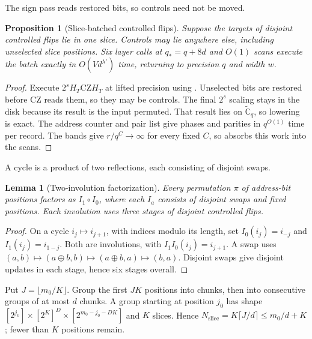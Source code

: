 \documentclass[11pt]{article}
\newtheorem{lemma}[theorem]{Lemma}
\newtheorem{proposition}[theorem]{Proposition}
\theoremstyle{definition}
\renewcommand{\label}[1]{}%
\newcommand{\Cg}{\widetilde{\mathbb{C}}}
\newcommand{\CZ}{\mathrm{CZ}}
\begin{document}
The sign pass reads restored bits, so controls need not be moved.

\begin{proposition}[Slice-batched controlled flips]\label{prop:slice-cnot}
Suppose the targets of disjoint controlled flips lie in one slice.
Controls may lie anywhere else, including unselected slice positions.
Six layer calls at $q_*=q+8d$ and $O(1)$ scans execute the batch exactly
in $O(Vd^{\lambda'})$ time, returning to precision $q$ and width $w$.
\end{proposition}
\begin{proof}
Execute $2^sH_T\CZ H_T$ at lifted precision using
.
Unselected bits are restored before $\CZ$ reads them, so they may be controls.
The final $2^s$ scaling stays in the disk because its result is the input permuted.
That result lies on $\Cg_q$, so lowering is exact.
The address counter and pair list give phases and parities in $q^{O(1)}$ time per record.
The bands give $r/q^C\to\infty$ for every fixed $C$, so  absorbs this work into the scans.
\end{proof}

A cycle is a product of two reflections, each consisting of disjoint swaps.

\begin{lemma}[Two-involution factorization]\label{lem:two-involutions}
Every permutation $\pi$ of address-bit positions factors as $I_1\circ I_0$,
where each $I_a$ consists of disjoint swaps and fixed positions.
Each involution uses three stages of disjoint controlled flips.
\end{lemma}
\begin{proof}
On a cycle $i_j\mapsto i_{j+1}$, with indices modulo its length, set
$I_0(i_j)=i_{-j}$ and $I_1(i_j)=i_{1-j}$.
Both are involutions, with $I_1I_0(i_j)=i_{j+1}$.
A swap uses
$(a,b)\mapsto(a\oplus b,b)\mapsto(a\oplus b,a)\mapsto(b,a)$.
Disjoint swaps give disjoint updates in each stage, hence six stages overall.
\end{proof}

Put $J=\lfloor m_0/K\rfloor$.
Group the first $JK$ positions into chunks, then into consecutive groups of at most $d$ chunks.
A group starting at position $j_0$ has shape
$[2^{j_0}]\times[2^K]^D\times[2^{m_0-j_0-DK}]$ and $K$ slices.
Hence $N_{\mathrm{slice}}=K\lceil J/d\rceil\le m_0/d+K$;
fewer than $K$ positions remain.
\end{document}

